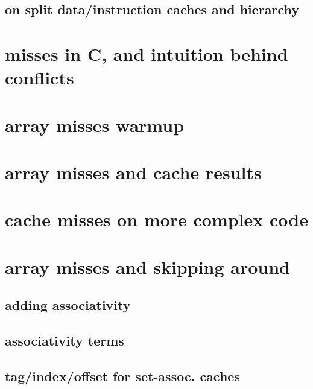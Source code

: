 \subsection{on split data/instruction caches and hierarchy}


\section{misses in C, and intuition behind conflicts}


\section{array misses warmup}


\section{array misses and cache results}


\section{cache misses on more complex code}


\section{array misses and skipping around}


\subsection{adding associativity}



\subsection{associativity terms}


\subsection{tag/index/offset for set-assoc. caches}


